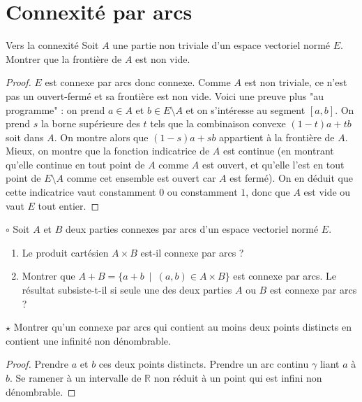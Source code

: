 \documentclass[french,a4paper]{article}
\newcommand{\R}{\mathbb{R}}
\theoremstyle{plain}
\theoremstyle{definition}
\theoremstyle{remark}
\begin{document}
\section{Connexité par arcs}

\begin{ex}[Moulin.34]{Vers la connexité}
	Soit $A$ une partie non triviale d'un espace vectoriel normé $E$. Montrer que la frontière de $A$ est non vide.
\end{ex}
\begin{proof}
	$E$ est connexe par arcs donc connexe. Comme $A$ est non triviale, ce n'est pas un ouvert-fermé et sa frontière est non vide. Voici une preuve plus "au programme" : on prend $a\in A$ et $b\in E\setminus A$ et on s'intéresse au segment $[a,b]$. On prend $s$ la borne supérieure des $t$ tels que la combinaison convexe $(1-t)a+tb$ soit dans $A$. On montre alors que $(1-s)a+sb$ appartient à la frontière de $A$. Mieux, on montre que la fonction indicatrice de $A$ est continue (en montrant qu'elle continue en tout point de $A$ comme $A$ est ouvert, et qu'elle l'est en tout point de $E\setminus A$ comme cet ensemble est ouvert car $A$ est fermé). On en déduit que cette indicatrice vaut constamment $0$ ou constamment $1$, donc que $A$ est vide ou vaut $E$ tout entier.
\end{proof}

\begin{ex}[Moulin.35]{$\circ$}
	Soit $A$ et $B$ deux parties connexes par arcs d'un espace vectoriel normé $E$.
	\begin{enumerate}
		\item Le produit cartésien $A\times B$ est-il connexe par arcs ?
		\item Montrer que $A+B=\{a+b\ \mid\ (a,b)\in A\times B\}$ est connexe par arcs. Le résultat subsiste-t-il si seule une des deux parties $A$ ou $B$ est connexe par arcs ?
	\end{enumerate}
\end{ex}

\begin{ex}[Moulin.36]{$\star$}
	Montrer qu'un connexe par arcs qui contient au moins deux points distincts en contient une infinité non dénombrable.
\end{ex}
\begin{proof}
	Prendre $a$ et $b$ ces deux points distincts. Prendre un arc continu $\gamma$ liant $a$ à $b$. Se ramener à un intervalle de $\R$ non réduit à un point qui est infini non dénombrable.
\end{proof}
\end{document}
